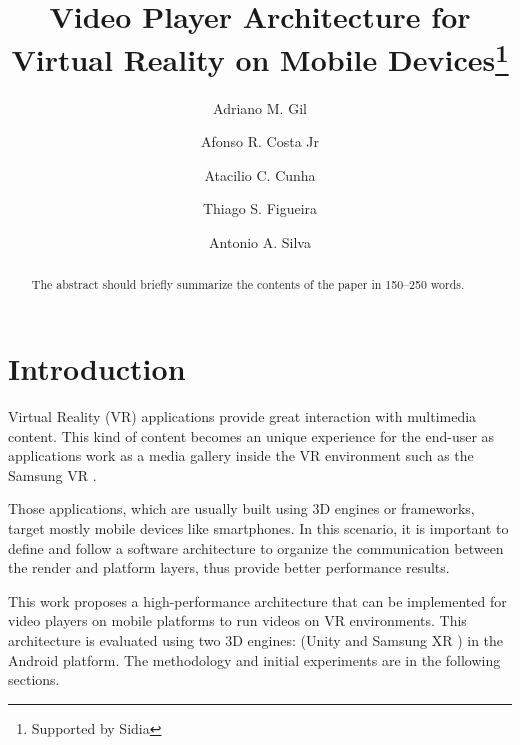 \documentclass[runningheads]{llncs}
\begin{document}
%
\title{Video Player Architecture for Virtual Reality on Mobile Devices\thanks{Supported by Sidia}}
%
%
\author{Adriano M. Gil \and
Afonso R. Costa Jr \and
Atacilio C. Cunha \and
Thiago S. Figueira \and
Antonio A. Silva}


%
%
%
\maketitle              %
%
\begin{abstract}
The abstract should briefly summarize the contents of the paper in
150--250 words.

\end{abstract}
%
%
%
\section{Introduction}

 Virtual Reality (VR) applications provide great interaction with multimedia content. This kind of content becomes an unique experience for the end-user as applications work as a media gallery inside the VR environment such as the Samsung VR \cite{SVR}.

Those applications, which are usually built using 3D engines or frameworks, target mostly mobile devices like smartphones. In this scenario, it is important to define and follow a software architecture to organize the communication between the render and platform layers, thus provide better performance results.


This work proposes a high-performance architecture that can be implemented for video players on mobile platforms to run videos on VR environments. This architecture is evaluated using two 3D engines: (Unity \cite{Unity} and Samsung XR \cite{SXR}) in the Android platform. The methodology and initial experiments are in the following sections.
\end{document}
